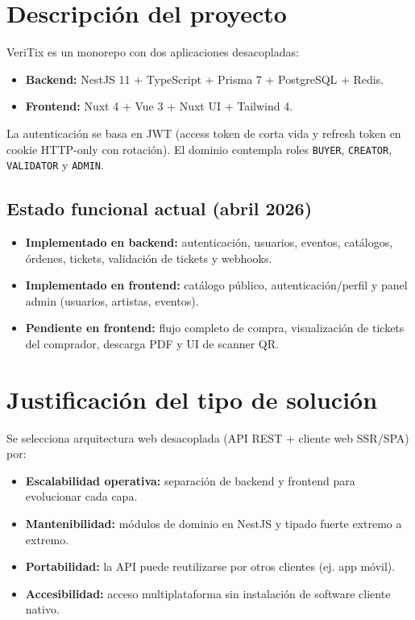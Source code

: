 \documentclass[
  11pt,
  a4paper,
  twoside=false,
  parskip=half               %
]{scrreprt}                  %
\providecommand{\tightlist}{%
  \setlength{\itemsep}{0pt}\setlength{\parskip}{0pt}}
\begin{document}
\hypertarget{descripciuxf3n-del-proyecto}{%
\section{Descripción del proyecto}\label{descripciuxf3n-del-proyecto}}

VeriTix es un monorepo con dos aplicaciones desacopladas:

\begin{itemize}
\tightlist
\item
  \textbf{Backend:} NestJS 11 + TypeScript + Prisma 7 + PostgreSQL +
  Redis.
\item
  \textbf{Frontend:} Nuxt 4 + Vue 3 + Nuxt UI + Tailwind 4.
\end{itemize}

La autenticación se basa en JWT (access token de corta vida y refresh
token en cookie HTTP-only con rotación). El dominio contempla roles
\texttt{BUYER}, \texttt{CREATOR}, \texttt{VALIDATOR} y \texttt{ADMIN}.

\hypertarget{estado-funcional-actual-abril-2026}{%
\subsection{Estado funcional actual (abril
2026)}\label{estado-funcional-actual-abril-2026}}

\begin{itemize}
\tightlist
\item
  \textbf{Implementado en backend:} autenticación, usuarios, eventos,
  catálogos, órdenes, tickets, validación de tickets y webhooks.
\item
  \textbf{Implementado en frontend:} catálogo público,
  autenticación/perfil y panel admin (usuarios, artistas, eventos).
\item
  \textbf{Pendiente en frontend:} flujo completo de compra,
  visualización de tickets del comprador, descarga PDF y UI de scanner
  QR.
\end{itemize}

\hypertarget{justificaciuxf3n-del-tipo-de-soluciuxf3n}{%
\section{Justificación del tipo de
solución}\label{justificaciuxf3n-del-tipo-de-soluciuxf3n}}

Se selecciona arquitectura web desacoplada (API REST + cliente web
SSR/SPA) por:

\begin{itemize}
\tightlist
\item
  \textbf{Escalabilidad operativa:} separación de backend y frontend
  para evolucionar cada capa.
\item
  \textbf{Mantenibilidad:} módulos de dominio en NestJS y tipado fuerte
  extremo a extremo.
\item
  \textbf{Portabilidad:} la API puede reutilizarse por otros clientes
  (ej. app móvil).
\item
  \textbf{Accesibilidad:} acceso multiplataforma sin instalación de
  software cliente nativo.
\end{itemize}
\end{document}
